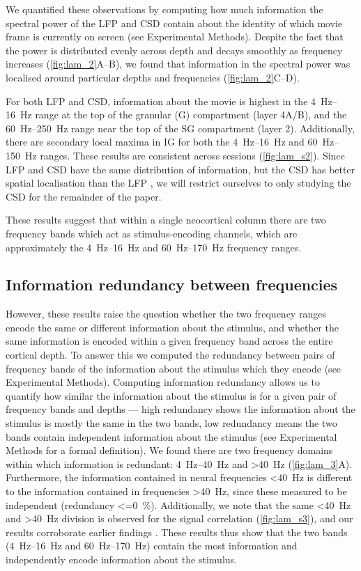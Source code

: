 We quantified these observations by computing how much information the spectral power of the \ac{LFP} and \ac{CSD} contain about the identity of which movie frame is currently on screen (see Experimental Methods).
Despite the fact that the power is distributed evenly across depth and decays smoothly as frequency increases (\autoref{fig:lam_2}A--B), we found that information in the spectral power was localised around particular depths and frequencies (\autoref{fig:lam_2}C--D).

For both \ac{LFP} and \ac{CSD}, information about the movie is highest in the \SIrange{4}{16}{Hz} range at the top of the granular (\ac{G}) compartment (layer 4A/B), and the \SIrange{60}{250}{Hz} range near the top of the \ac{SG} compartment (layer 2).
Additionally, there are secondary local maxima in \ac{IG} for both the \SIrange{4}{16}{Hz} and \SIrange{60}{150}{Hz} ranges.
These results are consistent across sessions (\autoref{fig:lam_s2}).
Since \ac{LFP} and \ac{CSD} have the same distribution of information, but the \ac{CSD} has better spatial localisation than the \ac{LFP} \citep{Einevoll2013,Kajikawa2011}, we will restrict ourselves to only studying the \ac{CSD} for the remainder of the paper.

These results suggest that within a single neocortical column there are two frequency bands which act as stimulus-encoding channels, which are approximately the \SIrange{4}{16}{Hz} and \SIrange{60}{170}{Hz} frequency ranges.



\subsection{Information redundancy between frequencies}
However, these results raise the question whether the two frequency ranges encode the same or different information about the stimulus, and whether the same information is encoded within a given frequency band across the entire cortical depth. 
To answer this we computed the redundancy between pairs of frequency bands of the information about the stimulus which they encode (see Experimental Methods).
Computing information redundancy allows us to quantify how similar the information about the stimulus is for a given pair of frequency bands and depths --- high redundancy shows the information about the stimulus is mostly the same in the two bands, low redundancy means the two bands contain independent information about the stimulus (see Experimental Methods for a formal definition).
We found there are two frequency domains within which information is redundant: \SIrange{4}{40}{Hz} and \SI{>40}{Hz} (\autoref{fig:lam_3}A).
Furthermore, the information contained in neural frequencies \SI{<40}{Hz} is different to the information contained in frequencies \SI{>40}{Hz}, since these measured to be independent (redundancy \SI{<=0}{\percent}).
Additionally, we note that the same \SI{<40}{Hz} and \SI{>40}{Hz} division is observed for the signal correlation (\autoref{fig:lam_s3}), and our results corroborate earlier findings \citep{Belitski2008}.
These results thus show that the two bands (\SIrange{4}{16}{Hz} and \SIrange{60}{170}{Hz}) contain the most information and independently encode information about the stimulus.

